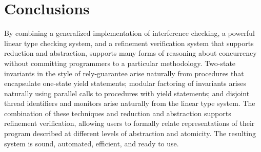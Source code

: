 \section{Conclusions}

By combining a generalized implementation of interference checking, a powerful linear type checking system, and a refinement verification system that supports reduction and abstraction, 
\civl supports many forms of reasoning about concurrency without committing programmers to a particular methodology.
Two-state invariants in the style of rely-guarantee arise naturally from procedures that encapsulate one-state yield statements;
modular factoring of invariants arises naturally using parallel calls to procedures with yield statements;
and disjoint thread identifiers and monitors arise naturally from the linear type system. The combination of these techniques and reduction and abstraction supports refinement verification, allowing users to formally relate representations of their program described at different levels of abstraction and atomicity. 
The resulting system is sound, automated, efficient, and ready to use.

